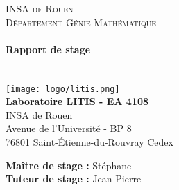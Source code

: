 \makeatletter
  \begin{titlepage}
  \centering
      {\large \textsc{INSA de Rouen}}\\
      \textsc{Département Génie Mathématique}\\
    \vspace{1cm}
      {\large\textbf{	\@date\\
       Rapport de stage}}\\
       \vspace{7cm}
       {\LARGE \textbf{\@title}} \\
    \vspace{2em}
        {\large \@author} \\
    \vfill
    \texttt{[image: logo/litis.png]}\\
    {\LARGE \textbf{Laboratoire LITIS - EA 4108}}\\
    {\large INSA de Rouen\\
    Avenue de l’Université - BP 8\\
    76801 Saint-Étienne-du-Rouvray Cedex}
    \vfill

    \raggedleft
    {\large \textbf{Maître de stage :} Stéphane \\
    \textbf{Tuteur de stage :} Jean-Pierre }
    \vspace{1cm}
  \end{titlepage}
\makeatother

\newpage
\tableofcontents
